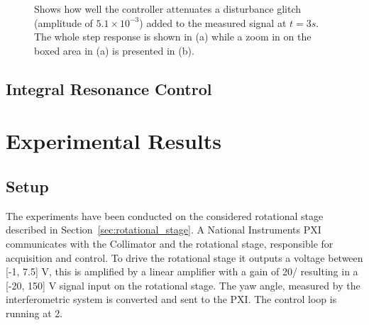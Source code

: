 \begin{figure}[h!]
  \centering %
  \qquad
  \caption{\label{fig:distmeasrejection} Shows how well the controller attenuates a disturbance glitch (amplitude of $5.1 \times 10^{-3}$) added to the measured signal at $t=3s$. The whole step response is shown in (a) while a zoom in on the boxed area in (a) is presented in (b).}
\end{figure}

\subsection{Integral Resonance Control}




\section{Experimental Results}
\subsection{Setup}
The experiments have been conducted on the considered rotational stage described in Section~\ref{sec:rotational_stage}. A National Instruments PXI communicates with the Collimator and the rotational stage, responsible for acquisition and control. To drive the rotational stage it outputs a voltage between [-1, 7.5] V, this is amplified by a linear amplifier with a gain of \unit{20}{\volt/\volt} resulting in a [-20, 150] V signal input on the rotational stage. The yaw angle, measured by the interferometric system is converted and sent to the PXI. The control loop is running at \unit{2}{\kilo\hertz}.
